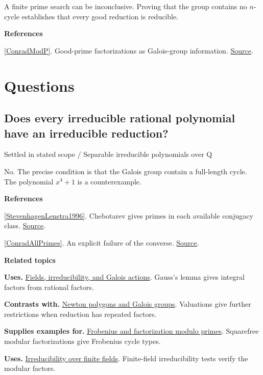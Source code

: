 \documentclass[11pt,a4paper,oneside,openany]{book}
\newenvironment{sources}{\par\smallskip\begingroup\footnotesize\color{atlasgray}\leftskip=10pt\setlength{\parskip}{2pt}}{\par\endgroup\smallskip}
\begin{document}
\color{black} A finite prime search can be inconclusive. Proving that the group contains no \(n\)-cycle establishes that every good reduction is reducible.\par
\begin{sources}
\textbf{References}\par\smallskip
\noindent\hyperlink{ref:ConradModP}{[ConradModP]}. Good-prime factorizations as Galois-group information. \href{https://kconrad.math.uconn.edu/blurbs/gradnumthy/galois-Q-factor-mod-p.pdf}{Source}.\par
\end{sources}\color{black}
\section*{Questions}
\subsection*{Does every irreducible rational polynomial have an irreducible reduction?}
{\small\sffamily\color{atlasgold}Settled in stated scope / Separable irreducible polynomials over Q}\par\smallskip
\color{black} No. The precise condition is that the Galois group contain a full-length cycle. The polynomial \(x^4+1\) is a counterexample.\par
\begin{sources}
\textbf{References}\par\smallskip
\noindent\hyperlink{ref:StevenhagenLenstra1996}{[StevenhagenLenstra1996]}. Chebotarev gives primes in each available conjugacy class. \href{https://pub.math.leidenuniv.nl/~lenstrahw/PUBLICATIONS/1996d/art.pdf}{Source}.\par
\noindent\hyperlink{ref:ConradAllPrimes}{[ConradAllPrimes]}. An explicit failure of the converse. \href{https://kconrad.math.uconn.edu/blurbs/ringtheory/reducibleallp.pdf}{Source}.\par
\end{sources}\color{black}
\par\medskip\begingroup\footnotesize\setlength{\parskip}{1pt}\textbf{\sffamily\color{atlasgreen}Related topics}\par
\color{black}\textbf{Uses.} \hyperlink{article:foundations}{Fields, irreducibility, and Galois actions}. Gauss's lemma gives integral factors from rational factors.\par
\color{black}\textbf{Contrasts with.} \hyperlink{article:newton-polygons}{Newton polygons and Galois groups}. Valuations give further restrictions when reduction has repeated factors.\par
\color{black}\textbf{Supplies examples for.} \hyperlink{article:frobenius}{Frobenius and factorization modulo primes}. Squarefree modular factorizations give Frobenius cycle types.\par
\color{black}\textbf{Uses.} \hyperlink{article:finite-field-irreducibility}{Irreducibility over finite fields}. Finite-field irreducibility tests verify the modular factors.\par
\endgroup
\end{document}
